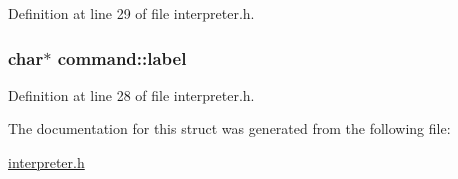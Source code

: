 Definition at line 29 of file interpreter.\-h.

\hypertarget{structcommand_a556cd9d8b435c0017704254f3d9a3e57}{
\subsubsection[{label}]{\setlength{\rightskip}{0pt plus 5cm}char$\ast$ command\-::label}}\label{structcommand_a556cd9d8b435c0017704254f3d9a3e57}


Definition at line 28 of file interpreter.\-h.



The documentation for this struct was generated from the following file\-:\begin{DoxyCompactItemize}
\item 
\hyperlink{interpreter_8h}{interpreter.\-h}\end{DoxyCompactItemize}
